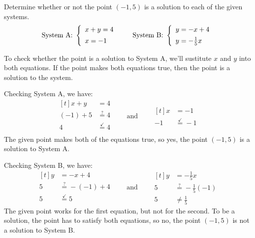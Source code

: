 \begin{boxedex}
Determine whether or not the point $(-1,5)$ is a solution to each of the given systems.
\[
\text{System A: }\twosystem{x+y=4}{x=-1}
\qquad
\text{System B: }\twosystem{y=-x+4}{y=-\tfrac{1}{5}x}
\] 


To check whether the point is a solution to System A, we'll sustitute $x$ and $y$ into both equations. If the point makes both equations true, then the point is a solution to the system.

Checking System A, we have:
\[
\begin{aligned}[t]
x+y		&=4\\
(-1)+5	&\overset{?}{=}4\\
4 		&\overset{\checkmark}{=} 4\\
\end{aligned}
\qquad\text{and}\qquad
\begin{aligned}[t]
x 	&= -1\\
-1	&\overset{\checkmark}{=}  -1
\end{aligned}
\]
The given point makes both of the equations true, so yes, the point $(-1,5)$ is a solution to System A.

Checking System B, we have:
\[
\begin{aligned}[t]
y		&=-x+4\\
5		&\overset{?}{=}-(-1)+4\\
5 		&\overset{\checkmark}{=} 5\\
\end{aligned}
\qquad\text{and}\qquad
\begin{aligned}[t]
y 	&= -\tfrac{1}{5}x\\
5	&\overset{?}{=} -\tfrac{1}{5}(-1)\\
5	&\neq \tfrac{1}{5}
\end{aligned}
\] 
The given point works for the first equation, but not for the second. To be a solution, the point has to satisfy both equations, so no, the point $(-1,5)$ is not a solution to System B.
\end{boxedex}

